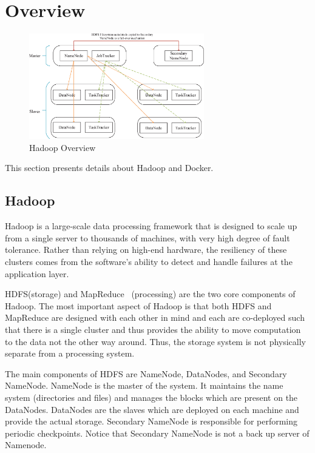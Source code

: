\section{Overview}
\label{sec:overview}

\begin{figure}[t]
  \centering
  \includegraphics[width=3in]{figs/HadoopOverview.eps}
  \caption{Hadoop Overview}
  \label{fig:overview}
\end{figure}

This section presents details about Hadoop and Docker.

\subsection{Hadoop}

Hadoop is a large-scale data processing framework that is designed to scale up from a single server to thousands of machines, with very high degree of fault tolerance. Rather than relying on high-end hardware, the resiliency of these clusters comes from the software's ability to detect and handle failures at the application layer.

HDFS(storage) and MapReduce~\cite{dean2008mapreduce} (processing) are the two core components of Hadoop. The most important aspect of Hadoop is that both HDFS and MapReduce are designed with each other in mind and each are co-deployed such that there is a single cluster and thus provides the ability to move computation to the data not the other way around. Thus, the storage system is not physically separate from a processing system.

The main components of HDFS are NameNode, DataNodes, and Secondary NameNode. NameNode is the master of the system. It maintains the name system (directories and files) and manages the blocks which are present on the DataNodes. DataNodes are the slaves which are deployed on each machine and provide the actual storage. Secondary NameNode is responsible for performing periodic checkpoints. Notice that Secondary NameNode is not a back up server of Namenode.

